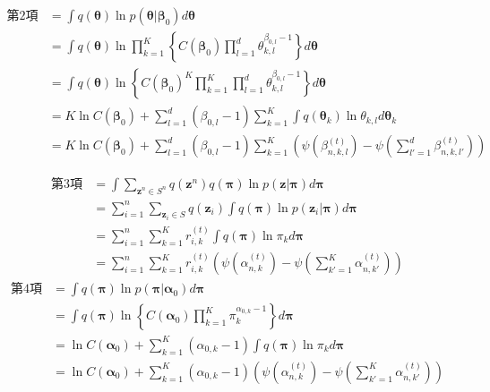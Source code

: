 \documentclass{jsarticle}%
\theoremstyle{definition}
\begin{document}
\begin{align}
    第2項 & =\int q(\bm{\theta})\ln p(\bm{\theta}|\bm{\beta}_0)d\bm{\theta}                                                                                          \\
          & =\int q(\bm{\theta})\ln \prod^K_{k=1}\left\{C(\boldsymbol{\beta}_0)\prod^d_{l=1}\theta_{k,l}^{\beta_{0,l}-1}\right\}d\bm{\theta}                         \\
          & =\int q(\bm{\theta})\ln \left\{C(\boldsymbol{\beta}_0)^K\prod^K_{k=1}\prod^d_{l=1}\theta_{k,l}^{\beta_{0,l}-1}\right\}d\bm{\theta}                       \\
          & =K\ln C(\bm{\beta}_0)+\sum^d_{l=1}(\beta_{0,l}-1)\sum^K_{k=1}\int q(\bm{\theta}_k)\ln \theta_{k,l}d\bm{\theta}_k                                         \\
          & =K\ln C(\bm{\beta}_0)+\sum^{d}_{l=1}(\beta_{0,l}-1)\sum^K_{k=1}\left(\psi(\beta^{(t)}_{n,k,l})-\psi\left(\sum^d_{l'=1}\beta^{(t)}_{n,k,l'}\right)\right)
\end{align}

\begin{align}
    第3項 & =\int\sum_{\bm{z}^n\in S^n}q(\bm{z}^n)q(\bm{\pi})\ln p(\bm{z}|\bm{\pi})d\bm{\pi}                                              \\
          & =\sum^n_{i=1}\sum_{\bm{z}_i\in S}q(\bm{z}_i)\int q(\bm{\pi})\ln p(\bm{z}_i|\bm{\pi})d\bm{\pi}                                 \\
          & =\sum^n_{i=1}\sum^K_{k=1}r^{(t)}_{i,k}\int q(\bm{\pi})\ln \pi_{k} d\bm{\pi}                                                   \\
          & =\sum^n_{i=1}\sum^K_{k=1}r^{(t)}_{i,k}\left(\psi(\alpha^{(t)}_{n,k})-\psi\left(\sum^K_{k'=1}\alpha^{(t)}_{n,k'}\right)\right)
\end{align}
\begin{align}
    第4項 & =\int q(\bm{\pi})\ln p(\bm{\pi}|\bm{\alpha}_0)d\bm{\pi}                                                                                     \\
          & =\int q(\bm{\pi})\ln \left\{C(\boldsymbol{\alpha}_0)\prod^K_{k=1}\pi_{k}^{\alpha_{0,k}-1}\right\}d\bm{\pi}                                  \\
          & =\ln C(\bm{\alpha}_0)+\sum^K_{k=1}(\alpha_{0,k}-1)\int q(\bm{\pi})\ln \pi_{k}d\bm{\pi}                                                      \\
          & =\ln C(\bm{\alpha}_0)+\sum^{K}_{k=1}(\alpha_{0,k}-1)\left(\psi(\alpha^{(t)}_{n,k})-\psi\left(\sum^K_{k'=1}\alpha^{(t)}_{n,k'}\right)\right)
\end{align}
\newpage
\end{document}
